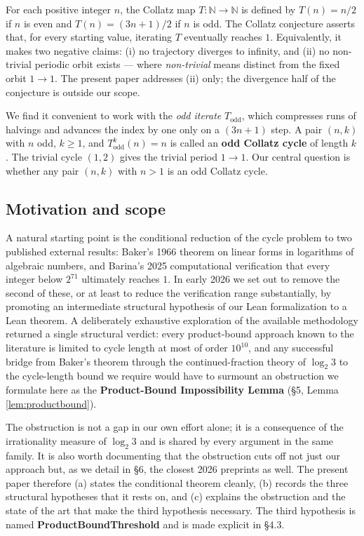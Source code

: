 \documentclass[
  11pt]{amsart}
\theoremstyle{plain}
\theoremstyle{definition}
\theoremstyle{remark}
\begin{document}
For each positive integer \(n\), the Collatz map
\(T: \mathbb{N} \to \mathbb{N}\) is defined by \(T(n) = n/2\) if \(n\)
is even and \(T(n) = (3n+1)/2\) if \(n\) is odd. The Collatz conjecture
asserts that, for every starting value, iterating \(T\) eventually
reaches \(1\). Equivalently, it makes two negative claims: (i) no
trajectory diverges to infinity, and (ii) no non-trivial periodic orbit
exists --- where \emph{non-trivial} means distinct from the fixed orbit
\(1 \to 1\). The present paper addresses (ii) only; the divergence half
of the conjecture is outside our scope.

We find it convenient to work with the \emph{odd iterate}
\(T_{\mathrm{odd}}\), which compresses runs of halvings and advances the
index by one only on a \((3n+1)\) step. A pair \((n, k)\) with \(n\)
odd, \(k \geq 1\), and \(T_{\mathrm{odd}}^k(n) = n\) is called an
\textbf{odd Collatz cycle} of length \(k\). The trivial cycle \((1, 2)\)
gives the trivial period \(1 \to 1\). Our central question is whether
any pair \((n, k)\) with \(n > 1\) is an odd Collatz cycle.

\subsection{Motivation and scope}\label{motivation-and-scope}

A natural starting point is the conditional reduction of the cycle
problem to two published external results: Baker's 1966 theorem on
linear forms in logarithms of algebraic numbers, and Barina's 2025
computational verification that every integer below \(2^{71}\)
ultimately reaches \(1\). In early 2026 we set out to remove the second
of these, or at least to reduce the verification range substantially, by
promoting an intermediate structural hypothesis of our Lean
formalization to a Lean theorem. A deliberately exhaustive exploration
of the available methodology returned a single structural verdict: every
product-bound approach known to the literature is limited to cycle
length at most of order \(10^{10}\), and any successful bridge from
Baker's theorem through the continued-fraction theory of \(\log_2 3\) to
the cycle-length bound we require would have to surmount an obstruction
we formulate here as the \textbf{Product-Bound Impossibility Lemma} (§5,
Lemma \ref{lem:productbound}).

The obstruction is not a gap in our own effort alone; it is a
consequence of the irrationality measure of \(\log_2 3\) and is shared
by every argument in the same family. It is also worth documenting that
the obstruction cuts off not just our approach but, as we detail in §6,
the closest 2026 preprints as well. The present paper therefore (a)
states the conditional theorem cleanly, (b) records the three structural
hypotheses that it rests on, and (c) explains the obstruction and the
state of the art that make the third hypothesis necessary. The third
hypothesis is named \textbf{ProductBoundThreshold} and is made explicit
in §4.3.
\end{document}
